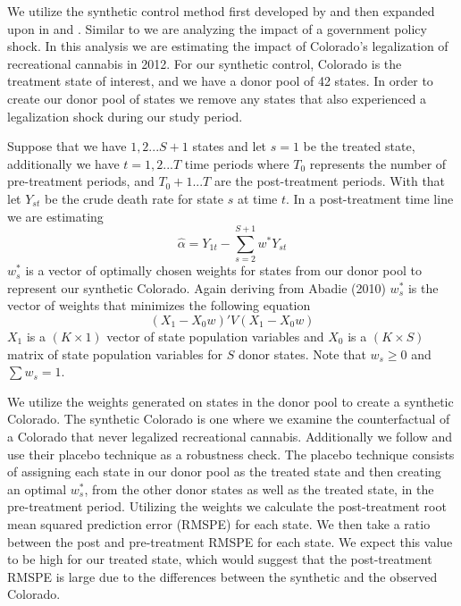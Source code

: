 \documentclass{article}
\begin{document}
We utilize the synthetic control method first developed by \citet{AbadieA2003TECo} and then expanded upon in \citet{AbadieAlberto2010SCMf} and \citet{AbadieAlberto2015CPat}. Similar to \citet{AbadieAlberto2010SCMf} we are analyzing the impact of a government policy shock. In this analysis we are estimating the impact of Colorado's legalization of recreational cannabis in 2012. For our synthetic control, Colorado is the treatment state of interest, and we have a donor pool of 42 states. In order to create our donor pool of states we remove any states that also experienced a legalization shock during our study period.

Suppose that we have $1,2...S+1$ states and let $s = 1$ be the treated state, additionally we have $t = 1,2...T$ time periods where $T_0$ represents the number of pre-treatment periods, and $T_0 + 1...T$ are the post-treatment periods. With that let $Y_{st}$ be the crude death rate for state $s$ at time $t$. In a post-treatment time line we are estimating
\begin{equation*}
\hat{\alpha} = Y_{1t} - \sum_{s=2}^{S+1}w^{*}Y_{st}
\end{equation*}
$w^{*}_s$ is a vector of optimally chosen weights for states from our donor pool to represent our synthetic Colorado. Again deriving from Abadie (2010) $w^{*}_s$ is the vector of weights that minimizes the following equation
\begin{equation*}
(X_1 - X_0w)'V(X_1 - X_0w)
\end{equation*}
$X_1$ is a $(K \times 1)$ vector of state population variables and $X_0$ is a $(K \times S)$ matrix of state population variables for $S$ donor states. Note that $w_s \geq 0$ and $\sum w_s = 1$.

We utilize the weights generated on states in the donor pool to create a synthetic Colorado. The synthetic Colorado is one where we examine the counterfactual of a Colorado that never legalized recreational cannabis. Additionally we follow \citet{AbadieAlberto2010SCMf} and use their placebo technique as a robustness check. The placebo technique consists of assigning each state in our donor pool as the treated state and then creating an optimal $w^{*}_s$, from the other donor states as well as the treated state, in the pre-treatment period. Utilizing the weights we calculate the post-treatment root mean squared prediction error (RMSPE) for each state. We then take a ratio between the post and pre-treatment RMSPE for each state. We expect this value to be high for our treated state, which would suggest that the post-treatment RMSPE is large due to the differences between the synthetic and the observed Colorado.
\end{document}
